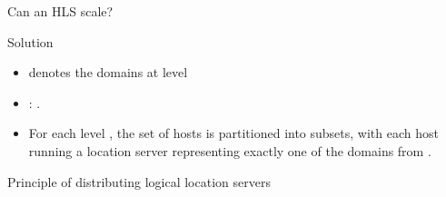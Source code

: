   \begin{slide}{Can an HLS scale?}
    \begin{block}{Solution}
      \begin{itemize}\tightlist
      \item {} denotes the
         domains at level 
      \item {}: . 
      \item For each level , the set of hosts is partitioned into  subsets, with
        each host running a location server representing exactly one of the domains  from
        .
      \end{itemize}
    \end{block}
    \begin{block}{Principle of distributing logical location servers}
      \begin{center}
      \end{center}
    \end{block}
  \end{slide}
